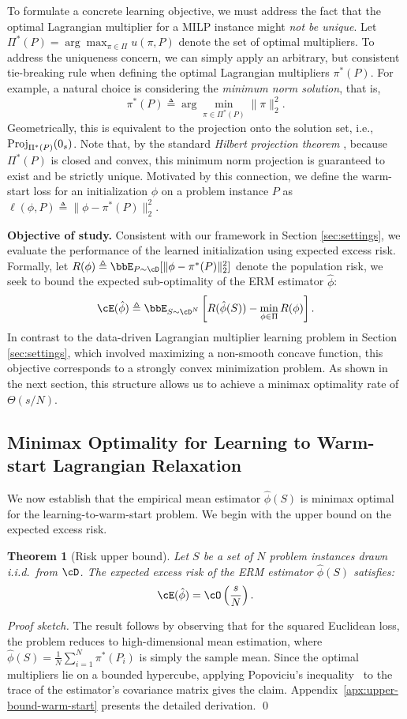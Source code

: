 \documentclass{article}
\theoremstyle{plain}
\newtheorem{theorem}{Theorem}[section]
\theoremstyle{definition}
\theoremstyle{remark}
\begin{document}
To formulate a concrete learning objective, we must address the fact that the optimal Lagrangian multiplier for a MILP instance might \textit{not be unique}. Let $\Pi^*(P) = \arg\max_{\pi \in \Pi}u(\pi, P)$ denote the set of optimal multipliers. To address the uniqueness concern, we can simply apply an arbitrary, but consistent tie-breaking rule when defining the optimal Lagrangian multipliers $\pi^*(P)$. For example, a natural choice is considering the \textit{minimum norm solution}, that is, 
\[
    \pi^*(P) \triangleq \arg \min_{\pi \in \Pi^*(P)} \|\pi\|_2^2.
\]
Geometrically, this is equivalent to the projection onto the solution set, i.e., $\textup{Proj}_{\Pi^*(P)}(0_s)$. Note that, by the standard \textit{Hilbert projection theorem} \citep[Theorem~12.3]{rudin1991functional}, because $\Pi^*(P)$ is closed and convex, this minimum norm projection is guaranteed to exist and be strictly unique. Motivated by this connection, we define the warm-start loss for an initialization $\phi$ on a problem instance $P$ as $\ell(\phi, P) \triangleq \|\phi - \pi^*(P)\|_2^2$.

\textbf{Objective of study.} Consistent with our framework in Section \ref{sec:settings}, we evaluate the performance of the learned initialization using expected excess risk. Formally, let $R(\phi) \triangleq \bbE_{P \sim \cD}[\|\phi - \pi^*(P)\|_2^2]$ denote the population risk, we seek to bound the expected sub-optimality of the ERM estimator $\hat{\phi}$:
\[
    \cE(\hat{\phi}) \triangleq \bbE_{S \sim \cD^N}\left[R(\hat{\phi}(S)) - \min_{\phi \in \Pi}R(\phi)\right].
\]
In contrast to the data-driven Lagrangian multiplier learning problem in Section \ref{sec:settings}, which involved maximizing a non-smooth concave function, this objective corresponds to a strongly convex minimization problem. As shown in the next section, this structure allows us to achieve a minimax optimality rate of $\Theta(s/N)$.
 
\subsection{Minimax Optimality for Learning to Warm-start Lagrangian Relaxation}
We now establish that the empirical mean estimator $\hat{\phi}(S)$ is minimax optimal for the learning-to-warm-start problem. We begin with the upper bound on the expected excess risk.
\begin{theorem}[Risk upper bound] \label{thm:upper-bound-warm-start}
     Let $S$ be a set of $N$ problem instances drawn i.i.d.~from $\cD$. The expected excess risk of the ERM estimator $\hat{\phi}(S)$ satisfies:
    \[
        \cE(\hat{\phi}) = \cO\left(\frac{s}{N}\right).
    \]
\end{theorem}
\textit{Proof sketch.} The result follows by observing that for the squared Euclidean loss, the problem reduces to high-dimensional mean estimation, where { $\hat{\phi}(S) = \frac{1}{N}\sum_{i = 1}^N \pi^*(P_i)$ is simply the sample mean. Since the optimal multipliers lie on a bounded hypercube, applying Popoviciu's inequality~\citep{niculescu2006refinement} to the trace of the estimator's covariance matrix gives the claim. Appendix~\ref{apx:upper-bound-warm-start} presents the detailed derivation.} 
\qed
\end{document}
